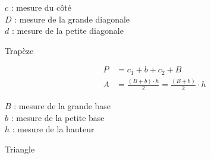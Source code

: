 \vspace{4pt}
{\small $c$ : mesure du côté\\
$D$ : mesure de la grande diagonale\\
$d$ : mesure de la petite diagonale}

\vfill
\textcolor{themeColor}{Trapèze}

\begin{minipage}[c]{0.45\linewidth}
\begin{center}
\end{center}
\end{minipage}
\hfill
\begin{minipage}[c]{0.5\linewidth}
\begin{align*}
P &= c_1+b+c_2+B\\[6pt]
A &= \frac{(B+b)\cdot h}{2} = \frac{(B+b)}{2}\cdot h
\end{align*}
\end{minipage}

\vspace{4pt}
{\small $B$ : mesure de la grande base \\
$b$ : mesure de la petite base\\
$h$ : mesure de la hauteur}

\vfill
\textcolor{themeColor}{Triangle}

